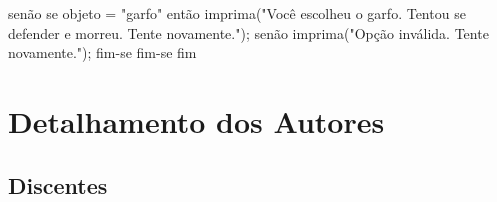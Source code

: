 \documentclass[a4paper,12pt]{article} %
\begin{document}
    senão se objeto = "garfo" então
        imprima("Você escolheu o garfo. Tentou se defender e morreu. Tente novamente.\n");
    senão
        imprima("Opção inválida. Tente novamente.\n");
    fim-se
    fim-se
fim



\section*{Detalhamento dos Autores}

\subsection*{Discentes}
\end{document}
